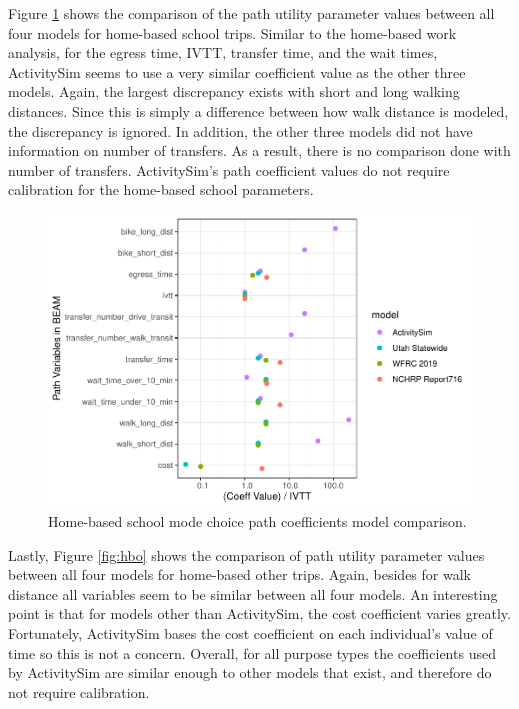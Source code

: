 \documentclass[12pt, oneside, openright]{byuthesis}
\begin{document}
Figure \ref{fig:hbs} shows the comparison of the path utility parameter values between all four models for home-based school trips. Similar to the home-based work analysis, for the egress time, IVTT, transfer time, and the wait times, ActivitySim seems to use a very similar coefficient value as the other three models. Again, the largest discrepancy exists with short and long walking distances. Since this is simply a difference between how walk distance is modeled, the discrepancy is ignored. In addition, the other three models did not have information on number of transfers. As a result, there is no comparison done with number of transfers. ActivitySim's path coefficient values do not require calibration for the home-based school parameters.

\begin{figure}

{\centering \includegraphics{thesis_files/figure-latex/hbs-1} 

}

\caption{Home-based school mode choice path coefficients model comparison.}\label{fig:hbs}
\end{figure}

Lastly, Figure \ref{fig:hbo} shows the comparison of path utility parameter values between all four models for home-based other trips. Again, besides for walk distance all variables seem to be similar between all four models. An interesting point is that for models other than ActivitySim, the cost coefficient varies greatly. Fortunately, ActivitySim bases the cost coefficient on each individual's value of time so this is not a concern. Overall, for all purpose types the coefficients used by ActivitySim are similar enough to other models that exist, and therefore do not require calibration.
\end{document}
